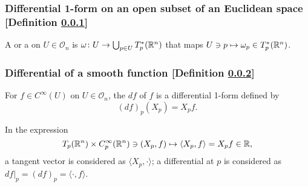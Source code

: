 \subsubsection{Differential 1-form on an open subset of an Euclidean space [Definition \ref{differential-1-form-on-an-open-subset-of-an-euclidean-space}]}\label{differential-1-form-on-an-open-subset-of-an-euclidean-space}
A  or a  on $U \in \mathcal{O}_n$ is $\omega \colon U \to \bigcup_{p \in U} T^*_p (\mathbb{R}^n)$ that maps $U \ni p \mapsto \omega_p \in T^*_p (\mathbb{R}^n)$.

\subsubsection{Differential of a smooth function [Definition \ref{differential-of-a-smooth-function}]}\label{differential-of-a-smooth-function}
For $f \in C^\infty (U)$ on $U \in \mathcal{O}_n$, the  $df$ of $f$ is a differential 1-form defined by
\[
(df)_p (X_p) = X_p f.
\]


In the expression
\[
T_p(\mathbb{R}^n) \times C^\infty_p (\mathbb{R}^n) \ni (X_p, f) \mapsto \langle X_p, f \rangle = X_p f \in \mathbb{R},
\]
a tangent vector is considered as $\langle X_p, \cdot \rangle$; a differential at $p$ is considered as $df|_p = (df)_p = \langle \cdot, f \rangle$.